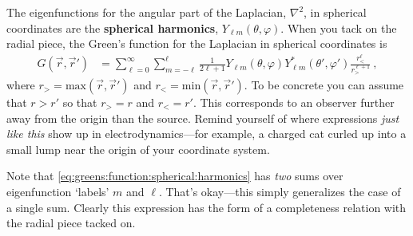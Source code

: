 \begin{example}
The eigenfunctions for the angular part of the Laplacian, $\nabla^2$, in spherical coordinates are the \textbf{spherical harmonics}, $Y_{\ell m}(\theta, \varphi)$. When you tack on the radial piece, the Green's function for the Laplacian in spherical coordinates is
\begin{align}
	G(\vec{r},\vec{r}')
	&=
	\sum_{\ell=0}^\infty
	\sum_{m=-\ell}^\ell
	\frac{1}{2\ell+1}
	Y_{\ell m}(\theta, \varphi)
	Y_{\ell m}^*(\theta', \varphi')
	\frac{r_<^\ell}{r_>^{\ell+1}} \ ,
	\label{eq:greens:function:spherical:harmonics}
\end{align}
where $r_> = \text{max}(\vec{r},\vec{r}')$ and $r_< = \text{min}(\vec{r},\vec{r}')$. To be concrete you can assume that $r > r'$ so that $r_> = r$ and $r_< = r'$. This corresponds to an observer further away from the origin than the source. Remind yourself of where expressions \emph{just like this} show up in electrodynamics---for example, a charged cat curled up into a small lump near the origin of your coordinate system.

Note that \eqref{eq:greens:function:spherical:harmonics} has \emph{two} sums over eigenfunction `labels' $m$ and $\ell$. That's okay---this simply generalizes the case of a single sum. Clearly this expression has the form of a completeness relation with the radial piece tacked on.


\end{example}
